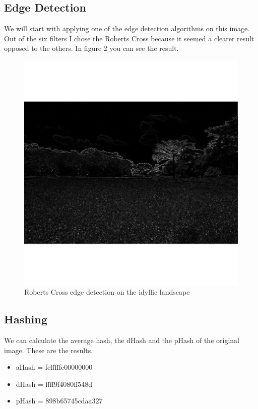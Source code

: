 \documentclass[12pt]{article}
\begin{document}
\subsection{Edge Detection}

We will start with applying one of the edge detection algorithms on this image. Out of the six filters I chose the Roberts Cross because it seemed a clearer result opposed to the others. In figure 2 you can see the result.

\begin{figure}[h]
\centering
\includegraphics[scale=0.38]{img/landscape_RobertsCross}
\caption{Roberts Cross edge detection on the idyllic landscape}
\end{figure}

\subsection{Hashing}
We can calculate the average hash, the dHash and the pHash of the original image. These are the results.

\begin{itemize}
\item aHash = fefffffc00000000
\item dHash = ffff9f4080ff548d
\item pHash = 898b65745cdaa327
\end{itemize}
\end{document}
